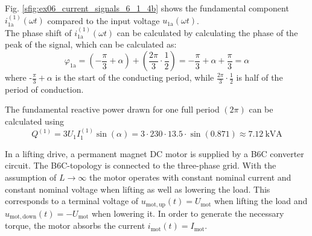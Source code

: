 \begin{solutionblock}
        Fig. \ref{sfig:ex06_current_signals_6_1_4b} shows the fundamental component $i^\mathrm{(1)}_\mathrm{1a}(\omega t)$ compared to the input voltage $u_\mathrm{1a}(\omega t)$.
        \\
        The phase shift of $i^\mathrm{(1)}_\mathrm{1a}(\omega t)$ can be calculated by calculating the phase of the peak of the signal, which can be calculated as: 
        \begin{equation}
            \varphi_\mathrm{1a} = (-\frac{\pi}{3} + \alpha) + (\frac{2\pi}{3} \cdot \frac{1}{2}) = -\frac{\pi}{3} + \alpha + \frac{\pi}{3} = \alpha   
        \end{equation}
        where -$\frac{\pi}{3} + \alpha$ is the start of the conducting period, while $\frac{2\pi}{3} \cdot \frac{1}{2}$ is half of the period of conduction.
        

    \end{solutionblock}
    \begin{solutionblock}
        The fundamental reactive power drawn for one full period $(2\pi)$ can be calculated using
        \begin{equation}
            Q^\mathrm{(1)} = 3 U_1 I^\mathrm{(1)}_1 \sin(\alpha)  = 3 \cdot 230 \cdot 13.5 \cdot \sin(0.871) \approx \SI{7.12}{\kilo \volt \ampere} 
        \end{equation}
    \end{solutionblock}

In a lifting drive, a permanent magnet DC motor is supplied by a B6C converter circuit. The B6C-topology is connected to the three-phase grid.
With the assumption of $L\rightarrow\infty$ the motor operates with constant nominal current and constant nominal voltage when lifting as well as lowering the load.
This corresponds to a terminal voltage of $u_\mathrm{mot,up}(t)=U_\mathrm{mot}$ when lifting the load and $u_\mathrm{mot,down}(t)=-U_\mathrm{mot}$ when lowering it.
In order to generate the necessary torque, the motor absorbs the current $i_\mathrm{mot}(t)=I_\mathrm{mot}$.



